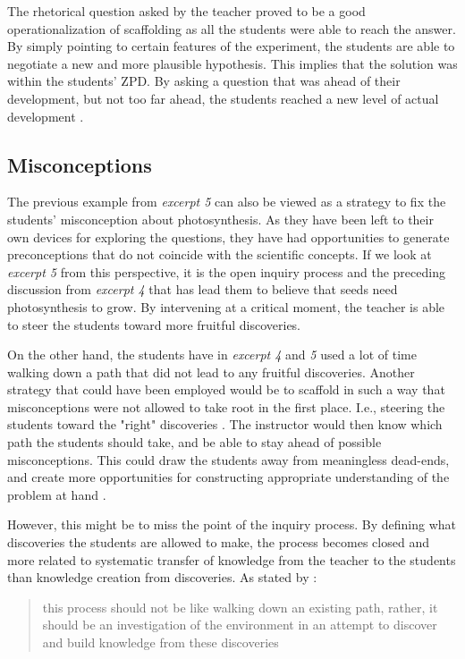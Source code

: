 The rhetorical question asked by the teacher proved to be a good operationalization of scaffolding as all the students were able to reach the answer. By simply pointing to certain features of the experiment, the students are able to negotiate a new and more plausible hypothesis. This implies that the solution was within the students' ZPD. By asking a question that was ahead of their development, but not too far ahead, the students reached a new level of actual development  \citep{vygotskiui1978mind}.

\subsection{Misconceptions}
The previous example from \emph{excerpt 5} can also be viewed as a strategy to fix the students' misconception about photosynthesis. As they have been left to their own devices for exploring the questions, they have had opportunities to generate preconceptions that do not coincide with the scientific concepts. If we look at \emph{excerpt 5} from this perspective, it is the open inquiry process and the preceding discussion from \emph{excerpt 4} that has lead them to believe that seeds need photosynthesis to grow. By intervening at a critical moment, the teacher is able to steer the students toward more fruitful discoveries. 

On the other hand, the students have in \emph{excerpt 4} and \emph{5} used a lot of time walking down a path that did not lead to any fruitful discoveries. Another strategy that could have been employed would be to scaffold in such a way that misconceptions were not allowed to take root in the first place. I.e., steering the students toward the "right" discoveries \citep{kluge2010simulation}. The instructor would then know which path the students should take, and be able to stay ahead of possible misconceptions. This could draw the students away from meaningless dead-ends, and create more opportunities for constructing appropriate understanding of the problem at hand \citep{kluge2010simulation}.

However, this might be to miss the point of the inquiry process. By defining what discoveries the students are allowed to make, the process becomes closed and more related to systematic transfer of knowledge from the teacher to the students than knowledge creation from discoveries. As stated by \citeauthor{de1998scientific}: \begin{quote}this process should not be like walking down an existing path, rather, it should be an investigation of the environment in an attempt to discover and build knowledge from these discoveries \citetext{\citet{de1998scientific}, referenced in \citealp{kluge2010simulation}}
\end{quote}

